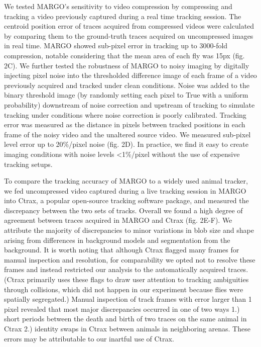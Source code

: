 \documentclass[10pt]{article}
\begin{document}
\begin{multicols}{2}
We tested MARGO's sensitivity to video compression by compressing and tracking a video previously captured during a real time tracking session. The centroid position error of traces acquired from compressed videos were calculated by comparing them to the ground-truth traces acquired on uncompressed images in real time. MARGO showed sub-pixel error in tracking up to 3000-fold compression, notable considering that the mean area of each fly was 15px (fig. 2C). We further tested the robustness of MARGO to noisy imaging by digitally injecting pixel noise into the thresholded difference image of each frame of a video previously acquired and tracked under clean conditions. Noise was added to the binary threshold image (by randomly setting each pixel to True with a uniform probability) downstream of noise correction and upstream of tracking to simulate tracking under conditions where noise correction is poorly calibrated. Tracking error was measured as the distance in pixels between tracked positions in each frame of the noisy video and the unaltered source video.  We measured sub-pixel level error up to 20\%/pixel noise (fig. 2D). In practice, we find it easy to create imaging conditions with noise levels <1\%/pixel without the use of expensive tracking setups.

To compare the tracking accuracy of MARGO to a widely used animal tracker, we fed uncompressed video captured during a live tracking session in MARGO into Ctrax\cite{Branson_High_2009}, a popular open-source tracking software package, and measured the discrepancy between the two sets of tracks. Overall we found a high degree of agreement between traces acquired in MARGO and Ctrax (fig. 2E-F). We attribute the majority of discrepancies to minor variations in blob size and shape arising from differences in background models and segmentation from the background. It is worth noting that although Ctrax flagged many frames for manual inspection and resolution, for comparability we opted not to resolve these frames and instead restricted our analysis to the automatically acquired traces. (Ctrax primarily uses these flags to draw user attention to tracking ambiguities through collisions, which did not happen in our experiment because flies were spatially segregated.) Manual inspection of track frames with error larger than 1 pixel revealed that most major discrepancies occurred in one of two ways 1.) short periods between the death and birth of two traces on the same animal in Ctrax 2.) identity swaps in Ctrax between animals in neighboring arenas. These errors may be attributable to our inartful use of Ctrax.


\end{multicols}
\end{document}
